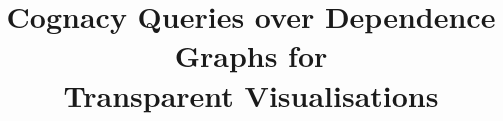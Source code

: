 \documentclass{llncs}
\begin{document}
\title{Cognacy Queries over Dependence Graphs for \\Transparent Visualisations}


\ifmain
  \maketitle
  
  
  
  
  
  
  
  
\fi




\ifappendices
   \clearpage
   \appendix
    
    
%   
%   
   
   
\fi
\end{document}
